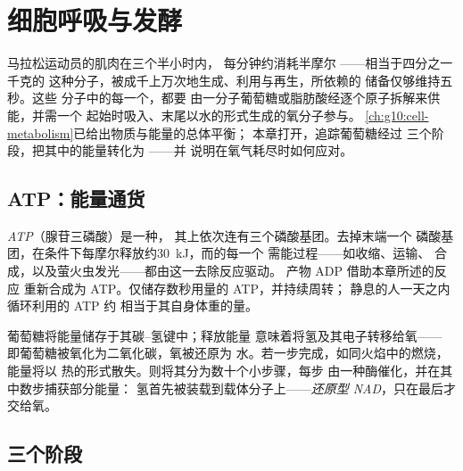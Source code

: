 \chapter{细胞呼吸与发酵}\label{ch:g12:respiration-fermentation}

马拉松运动员的肌肉在三个半小时内，
每分钟约消耗半摩尔 ——相当于四分之一千克的
这种分子，被成千上万次地生成、利用与再生，所依赖的
储备仅够维持五秒。这些  分子中的每一个，都要
由一分子葡萄糖或脂肪酸经逐个原子拆解来供能，并需一个
起始时吸入、末尾以水的形式生成的氧分子参与。
\cref{ch:g10:cell-metabolism}已给出物质与能量的总体平衡；
本章打开，追踪葡萄糖经过
三个阶段，把其中的能量转化为 ——并
说明在氧气耗尽时如何应对。

\section{ATP：能量通货}

\begin{definition}[ATP]\label{def:g12:respiration-fermentation:atp}
\emph{ATP}（腺苷三磷酸）是一种，
其上依次连有三个磷酸基团。去掉末端一个
磷酸基团，在条件下每摩尔释放约\qty{30}{kJ}，而的每一个
需能过程——如收缩、运输、
合成，以及萤火虫发光——都由这一去除反应驱动。
产物 ADP 借助本章所述的反应
重新合成为 ATP。仅储存数秒用量的 ATP，并持续周转；
静息的人一天之内循环利用的 ATP 约
相当于其自身体重的量。
\end{definition}

\begin{proposition}[能量藏于何处]\label{prop:g12:respiration-fermentation:oxidation}
葡萄糖将能量储存于其碳–氢键中；释放能量
意味着将氢及其电子转移给氧——
即葡萄糖被氧化为二氧化碳，氧被还原为
水。若一步完成，如同火焰中的燃烧，能量将以
热的形式散失。则将其分为数十个小步骤，每步
由一种酶催化，并在其中数步捕获部分能量：
氢首先被装载到载体分子上——\emph{还原型
NAD}，只在最后才交给氧。
\end{proposition}
\admitted

\section{三个阶段}

